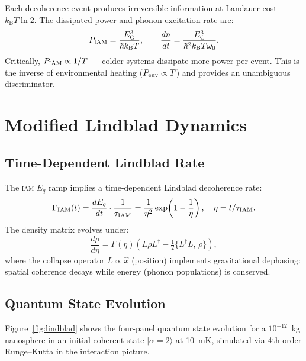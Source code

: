 \documentclass[12pt,letterpaper]{article}
\newcommand{\IAM}{\textsc{iam}}
\newcommand{\kB}{k_{\mathrm{B}}}
\newcommand{\EG}{E_{\mathrm{G}}}
\newcommand{\tauIAM}{\tau_{\mathrm{IAM}}}
\begin{document}
Each decoherence event produces irreversible information at Landauer cost
$\kB T \ln 2$. The dissipated power and phonon excitation rate are:
\begin{equation}
    P_{\rm IAM} = \frac{\EG^3}{\hbar \kB T}, \qquad
    \frac{dn}{dt} = \frac{\EG^3}{\hbar^2 \kB T \omega_0}.
    \label{eq:heating}
\end{equation}
Critically, $P_{\rm IAM} \propto 1/T$ --- colder systems dissipate more
power per event. This is the inverse of environmental heating
($P_{\rm env} \propto T$) and provides an unambiguous discriminator.

\section{Modified Lindblad Dynamics}

\subsection{Time-Dependent Lindblad Rate}

The \IAM{} $E_q$ ramp implies a time-dependent Lindblad decoherence rate:
\begin{equation}
    \Gamma_{\rm IAM}(t) = \frac{dE_q}{dt} \cdot \frac{1}{\tauIAM}
    = \frac{1}{\eta^2} \exp\!\left(1 - \frac{1}{\eta}\right),
    \quad \eta = t/\tauIAM.
    \label{eq:gamma_iam}
\end{equation}
The density matrix evolves under:
\begin{equation}
    \frac{d\rho}{d\eta} = \Gamma(\eta)\left(L\rho L^\dagger
    - \tfrac{1}{2}\{L^\dagger L,\, \rho\}\right),
    \label{eq:lindblad}
\end{equation}
where the collapse operator $L \propto \hat{x}$ (position) implements
gravitational dephasing: spatial coherence decays while energy (phonon
populations) is conserved.

\subsection{Quantum State Evolution}

Figure~\ref{fig:lindblad} shows the four-panel quantum state evolution for
a $10^{-12}$~kg nanosphere in an initial coherent state $|\alpha = 2\rangle$
at 10~mK, simulated via 4th-order Runge--Kutta in the interaction picture.
\end{document}
